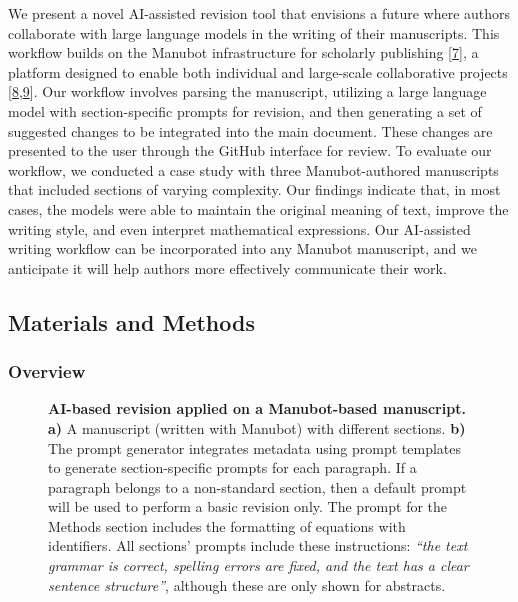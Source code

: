 \documentclass[
]{article}
\begin{document}
We present a novel AI-assisted revision tool that envisions a future where authors collaborate with large language models in the writing of their manuscripts.
This workflow builds on the Manubot infrastructure for scholarly publishing {[}\protect\hyperlink{ref-YuJbg3zO}{7}{]}, a platform designed to enable both individual and large-scale collaborative projects {[}\protect\hyperlink{ref-PZMP42Ak}{8},\protect\hyperlink{ref-10gsAq0o}{9}{]}.
Our workflow involves parsing the manuscript, utilizing a large language model with section-specific prompts for revision, and then generating a set of suggested changes to be integrated into the main document.
These changes are presented to the user through the GitHub interface for review.
To evaluate our workflow, we conducted a case study with three Manubot-authored manuscripts that included sections of varying complexity.
Our findings indicate that, in most cases, the models were able to maintain the original meaning of text, improve the writing style, and even interpret mathematical expressions.
Our AI-assisted writing workflow can be incorporated into any Manubot manuscript, and we anticipate it will help authors more effectively communicate their work.

\hypertarget{materials-and-methods}{%
\subsection{Materials and Methods}\label{materials-and-methods}}

\hypertarget{overview}{%
\subsubsection{Overview}\label{overview}}

\begin{figure}
\hypertarget{fig:ai_revision}{%
\centering

\caption{\textbf{AI-based revision applied on a Manubot-based manuscript.}
\textbf{a)} A manuscript (written with Manubot) with different sections.
\textbf{b)} The prompt generator integrates metadata using prompt templates to generate section-specific prompts for each paragraph.
If a paragraph belongs to a non-standard section, then a default prompt will be used to perform a basic revision only.
The prompt for the Methods section includes the formatting of equations with identifiers.
All sections' prompts include these instructions: \emph{``the text grammar is correct, spelling errors are fixed, and the text has a clear sentence structure''}, although these are only shown for abstracts.}\label{fig:ai_revision}
}
\end{figure}
\end{document}
